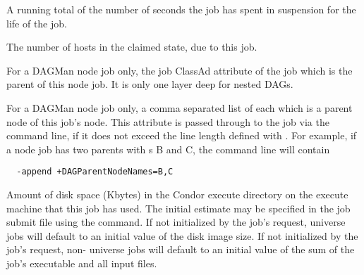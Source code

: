 \begin{description}
\item[\AdAttr{CumulativeSuspensionTime}:]  A running total of the number of
seconds the job has spent in suspension for the life of the job.

\item[\AdAttr{CurrentHosts}:]  The number of hosts in the claimed state,
due to this job.

\item[\AdAttr{DAGManJobId}:] For a DAGMan node job only,
the  job ClassAd attribute
of the  job which is the parent of this node job.
It is only one layer deep for nested DAGs.

\item[\AdAttr{DAGParentNodeNames}:] For a DAGMan node job only,
a comma separated list of each  which is a parent node of
this job's node.
This attribute is passed through to the job via the 
command line, if it does not exceed the line length defined with
. For example, if a node job has two parents
with s B and C, the  command line will 
contain
\begin{verbatim}
  -append +DAGParentNodeNames=B,C
\end{verbatim}

\item[\AdAttr{DiskUsage}:] Amount of disk space (Kbytes) in the Condor
execute directory on the execute machine that this job has used.
The initial estimate may be specified in the job
submit file using the  command.
If not initialized by the job's request,
 universe jobs will default to an initial value of the disk
image size. 
If not initialized by the job's request,
non- universe jobs will default to an initial value of the 
sum of the job's executable and all input files.


\end{description}
